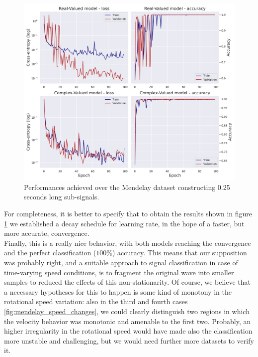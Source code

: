 \documentclass[../main.tex]{subfiles}
\begin{document}
\begin{figure}[ht]
	\centering
	\includegraphics[width=\textwidth]{pictures/mendeley_train_final}
	\caption{Performances achieved over the Mendelay dataset constructing 0.25 seconds long sub-signals.}
	\label{fig:mendeley_train_final}
\end{figure}
For completeness, it is better to specify that to obtain the results shown in figure \ref{fig:mendeley_train_final} we established a decay schedule for learning rate, in the hope of a faster, but more accurate, convergence.\\
Finally, this is a really nice behavior, with both models reaching the convergence and the perfect classification ($100\%$) accuracy. This means that our supposition was probably right, and a suitable approach to signal classification in case of time-varying speed conditions, is to fragment the original wave into smaller samples to reduced the effects of this non-stationarity. Of course, we believe that a necessary hypotheses for this to happen is some kind of monotony in the rotational speed variation: also in the third and fourth cases \ref{fig:mendelay_speed_changes}, we could clearly distinguish two regions in which the velocity behavior was monotonic and amenable to the first two. Probably, an higher irregularity in the rotational speed would have made also the classification more unstable and challenging, but we would need further more datasets to verify it.\\
\end{document}
